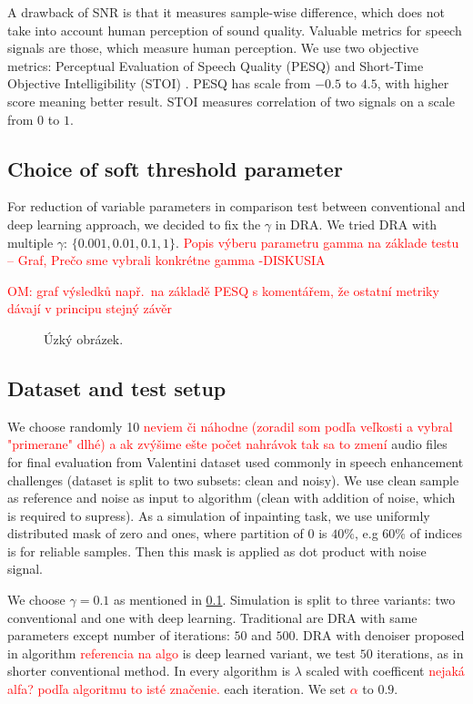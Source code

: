 \documentclass[conference]{IEEEtran}
\newcommand{\todo}[1]{\textcolor{red}{#1}}
\begin{document}
A drawback of SNR is that it measures sample-wise difference, which does not take into account human perception of sound quality.
Valuable metrics for speech signals are those, which measure human perception.
We use two objective metrics: Perceptual Evaluation of Speech Quality (PESQ) \cite{Rix2001} and 
Short-Time Objective Intelligibility (STOI) \cite{Taal2010}.
PESQ has scale from $-0.5$ to $4.5$, with higher score meaning better result.
STOI measures correlation of two signals on a scale from $0$ to $1$.

\subsection{Choice of soft threshold parameter}\label{subsec:soft_thresh}

For reduction of variable parameters in comparison test between conventional and deep learning approach, we decided to fix the $\gamma$ in DRA.
We tried DRA with multiple $\gamma$: $\{0.001, 0.01,0.1, 1\}$.
\todo{Popis výberu parametru gamma na základe testu -- Graf, Prečo sme vybrali konkrétne gamma -DISKUSIA}

\todo{OM: graf výsledků např.\ na základě PESQ s komentářem, že ostatní metriky dávají v principu stejný závěr}

\begin{figure}
	\caption{Úzký obrázek.}
\end{figure}

\subsection{Dataset and test setup}
We choose randomly 10 \todo{neviem či náhodne (zoradil som podľa veľkosti a vybral "primerane" dlhé) a ak zvýšime ešte počet nahrávok tak sa to zmení} audio files for final evaluation from Valentini dataset \cite{ValentiniBotinhao2017} used commonly in speech enhancement challenges (dataset is split to two subsets: clean and noisy).
We use clean sample as reference and noise as input to algorithm (clean with addition of noise, which is required to supress).
As a simulation of inpainting task, we use uniformly distributed mask of zero and ones, where partition of 0 is $40\%$,
e.g $60\%$ of indices is for reliable samples.
Then this mask is applied as dot product with noise signal.

We choose $\gamma = 0.1$ as mentioned in \ref{subsec:soft_thresh}.
Simulation is split to three variants: two conventional and one with deep learning.
Traditional are DRA with same parameters except number of iterations: $50$ and $500$.
DRA with denoiser proposed in algorithm \todo{referencia na algo} is deep learned variant, we test $50$ iterations,
as in shorter conventional method.
In every algorithm is $\lambda$ scaled with coefficent \todo{nejaká alfa? podľa algoritmu to isté značenie.} each iteration.
We set \todo{$\alpha$} to $0.9$.
\end{document}

